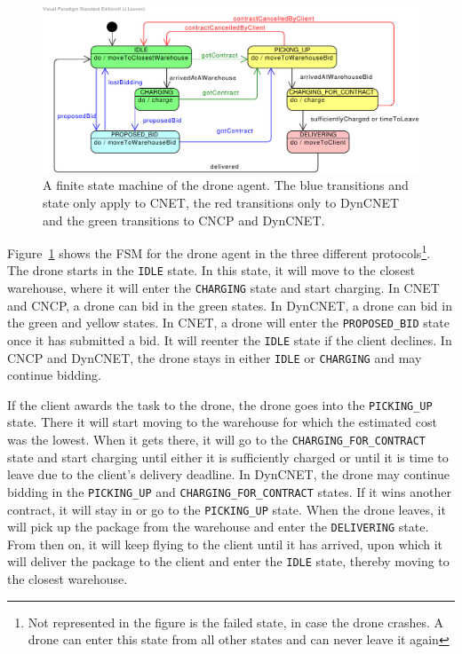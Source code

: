 \documentclass[10pt,a4paper]{article}
\begin{document}
\begin{figure}[htp]
    \centering
    \includegraphics[width=\columnwidth]{Drone}
    \caption{A finite state machine of the drone agent. The blue transitions and state only apply to CNET, the red transitions only to DynCNET and the green transitions to CNCP and DynCNET.}
    \label{fig:droneFSM}
\end{figure}

Figure~\ref{fig:droneFSM} shows the FSM for the drone agent in the three different protocols\footnote{Not represented in the figure is the failed state, in case the drone crashes. A drone can enter this state from all other states and can never leave it again}. The drone starts in the \texttt{IDLE} state. In this state, it will move to the closest warehouse, where it will enter the \texttt{CHARGING} state and start charging. In CNET and CNCP, a drone can bid in the green states. In DynCNET, a drone can bid in the green and yellow states. In CNET, a drone will enter the \texttt{PROPOSED\_BID} state once it has submitted a bid. It will reenter the \texttt{IDLE} state if the client declines. In CNCP and DynCNET, the drone stays in either \texttt{IDLE} or \texttt{CHARGING} and may continue bidding.

If the client awards the task to the drone, the drone goes into the \texttt{PICKING\_UP} state. There it will start moving to the warehouse for which the estimated cost was the lowest. When it gets there, it will go to the \texttt{CHARGING\_FOR\_CONTRACT} state and start charging until either it is sufficiently charged or until it is time to leave due to the client's delivery deadline. In DynCNET, the drone may continue bidding in the \texttt{PICKING\_UP} and \texttt{CHARGING\_FOR\_CONTRACT} states. If it wins another contract, it will stay in or go to the \texttt{PICKING\_UP} state. When the drone leaves, it will pick up the package from the warehouse and enter the \texttt{DELIVERING} state. From then on, it will keep flying to the client until it has arrived, upon which it will deliver the package to the client and enter the \texttt{IDLE} state, thereby moving to the closest warehouse.
\end{document}
